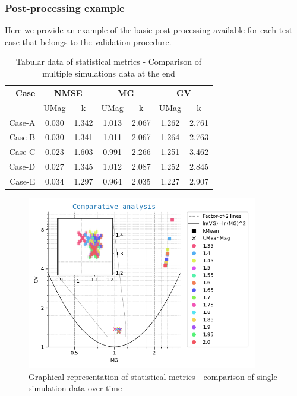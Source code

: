 \clearpage

\subsubsection{Post-processing example \label{sec:post_processing}}

Here we provide an example of the basic post-processing available for each test case that belongs to the validation procedure.

\begin{table}[ht]
    \centering
    \begin{tabular}{r|cc|cc|cc}  
        \toprule
        \textbf{Case} & \multicolumn{2}{c|}{\textbf{NMSE}} & \multicolumn{2}{c|}{\textbf{MG}} & \multicolumn{2}{c}{\textbf{GV}} \\
                     & UMag & k                           & UMag & k                         & UMag & k \\
        \midrule
        Case-A & 0.030 & 1.342 & 1.013 & 2.067 & 1.262 & 2.761 \\
        Case-B & 0.030 & 1.341 & 1.011 & 2.067 & 1.264 & 2.763 \\
        Case-C & 0.023 & 1.603 & 0.991 & 2.266 & 1.251 & 3.462 \\
        Case-D & 0.027 & 1.345 & 1.012 & 2.087 & 1.252 & 2.845 \\
        Case-E & 0.034 & 1.297 & 0.964 & 2.035 & 1.227 & 2.907 \\
        \bottomrule
    \end{tabular}
    \caption{Tabular data of statistical metrics - Comparison of multiple
        simulations data at the end}
    \label{tab:statistics}
\end{table}

\begin{figure}[h!]
    \centering
    \includegraphics[width=0.9\textwidth]{imgs/quantitative_package_single.png}
    \caption{Graphical representation of statistical metrics - comparison of single 
        simulation data over time}
    \vspace*{-0.5cm}
    \label{example_quantitative} 
\end{figure}

